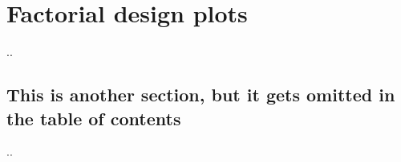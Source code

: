 \chapter{Factorial design plots}

..

\section*{This is another section, but it gets omitted in the table of contents}

..